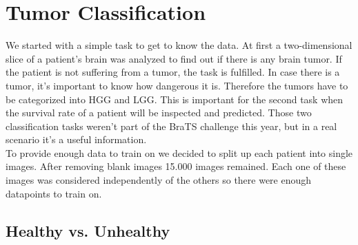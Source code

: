 \documentclass[a4paper,12pt,pagesize,headsepline,bibtotoc,titlepage]{scrartcl}
\begin{document}
\section{Tumor Classification}
\label{sec:classification}

We started with a simple task to get to know the data.
At first a two-dimensional slice of a patient's brain was analyzed to find out if there is any brain tumor.
If the patient is not suffering from a tumor, the task is fulfilled.
In case there is a tumor, it's important to know how dangerous it is.
Therefore the tumors have to be categorized into HGG and LGG.
This is important for the second task when the survival rate of a patient will be inspected and predicted.
Those two classification tasks weren't part of the BraTS challenge this year, but in a real scenario it's a useful information. \\
To provide enough data to train on we decided to split up each patient into single images.
After removing blank images 15.000 images remained.
Each one of these images was considered independently of the others so there were enough datapoints to train on.

\subsection{Healthy vs. Unhealthy}
\end{document}
